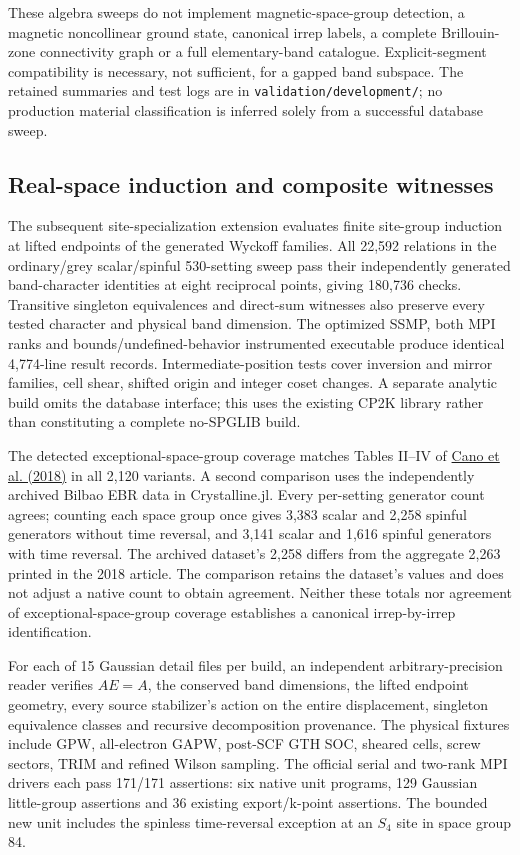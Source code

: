 \documentclass[11pt]{article}
\begin{document}
These algebra sweeps do not implement magnetic-space-group detection,
a magnetic noncollinear ground state, canonical irrep labels, a complete
Brillouin-zone connectivity graph or a full elementary-band catalogue.
Explicit-segment compatibility is necessary, not sufficient, for a
gapped band subspace. The retained summaries and test logs are in
\texttt{validation/development/}; no production material classification
is inferred solely from a successful database sweep.

\subsection{Real-space induction and composite witnesses}
The subsequent site-specialization extension evaluates finite
site-group induction at lifted endpoints of the generated Wyckoff
families. All 22,592 relations in the ordinary/grey scalar/spinful
530-setting sweep pass their independently generated band-character
identities at eight reciprocal points, giving 180,736 checks.
Transitive singleton equivalences and direct-sum witnesses also
preserve every tested character and physical band dimension.
The optimized SSMP, both MPI ranks and bounds/undefined-behavior
instrumented executable produce identical 4,774-line result records.
Intermediate-position tests cover inversion and mirror families,
cell shear, shifted origin and integer coset changes. A separate
analytic build omits the database interface; this uses the existing
CP2K library rather than constituting a complete no-SPGLIB build.

The detected exceptional-space-group coverage matches Tables II--IV
of \href{https://arxiv.org/abs/1709.01935}{Cano et al. (2018)} in all
2,120 variants. A second comparison uses the independently archived
Bilbao EBR data in Crystalline.jl. Every per-setting generator count
agrees; counting each space group once gives 3,383 scalar and 2,258
spinful generators without time reversal, and 3,141 scalar and 1,616
spinful generators with time reversal. The archived dataset's 2,258
differs from the aggregate 2,263 printed in the 2018 article.
The comparison retains the dataset's values and does not adjust a
native count to obtain agreement. Neither these totals nor agreement
of exceptional-space-group coverage establishes a canonical
irrep-by-irrep identification.

For each of 15 Gaussian detail files per build, an independent
arbitrary-precision reader verifies $AE=A$, the conserved band
dimensions, the lifted endpoint geometry, every source stabilizer's
action on the entire displacement, singleton equivalence classes and
recursive decomposition provenance. The physical fixtures include
GPW, all-electron GAPW, post-SCF GTH SOC, sheared cells, screw sectors,
TRIM and refined Wilson sampling. The official serial and two-rank
MPI drivers each pass 171/171 assertions: six native unit programs,
129 Gaussian little-group assertions and 36 existing export/k-point
assertions. The bounded new unit includes the spinless time-reversal
exception at an $S_4$ site in space group 84.
\end{document}
